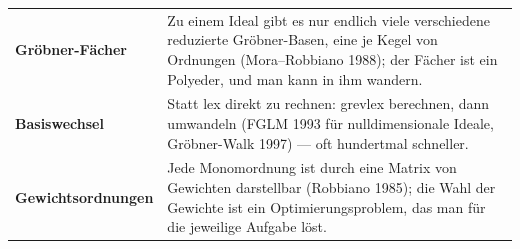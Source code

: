 \begin{forschung}
\begin{center}
{\small
\renewcommand{\arraystretch}{1.45}
\begin{tabular}{@{}P{3.0cm}P{5.2cm}@{}}
\toprule
\textbf{Gröbner-Fächer} & Zu einem Ideal gibt es nur endlich viele verschiedene reduzierte Gröbner-Basen, eine je Kegel von Ordnungen (Mora--Robbiano 1988); der Fächer ist ein Polyeder, und man kann in ihm wandern.\\
\textbf{Basiswechsel} & Statt lex direkt zu rechnen: grevlex berechnen, dann umwandeln (FGLM 1993 für nulldimensionale Ideale, Gröbner-Walk 1997) --- oft hundertmal schneller.\\
\textbf{Gewichts\-ordnungen} & Jede Monomordnung ist durch eine Matrix von Gewichten darstellbar (Robbiano 1985); die Wahl der Gewichte ist ein Optimierungsproblem, das man für die jeweilige Aufgabe löst.\\
\bottomrule
\end{tabular}}
\end{center}

\begin{center}
\begin{minipage}{0.88\textwidth}
\end{minipage}
\end{center}
\end{forschung}


